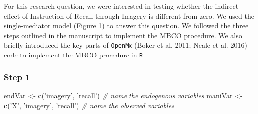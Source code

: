 \documentclass[11pt,]{article}
\newenvironment{Shaded}{\begin{snugshade}}{\end{snugshade}}
\newcommand{\CommentTok}[1]{\textcolor[rgb]{0.56,0.35,0.01}{\textit{#1}}}
\newcommand{\KeywordTok}[1]{\textcolor[rgb]{0.13,0.29,0.53}{\textbf{#1}}}
\newcommand{\NormalTok}[1]{#1}
\newcommand{\StringTok}[1]{\textcolor[rgb]{0.31,0.60,0.02}{#1}}
\begin{document}
For this research question, we were interested in testing whether the
indirect effect of Instruction of Recall through Imagery is different
from zero. We used the single-mediator model (Figure 1) to answer this
question. We followed the three steps outlined in the manuscript to
implement the MBCO procedure. We also briefly introduced the key parts
of \texttt{OpenMx} (Boker et al. 2011; Neale et al. 2016) code to
implement the MBCO procedure in \texttt{R}.

\hypertarget{step-1}{%
\subsubsection{Step 1}\label{step-1}}

\begin{Shaded}
\begin{Highlighting}[]
\NormalTok{endVar <-}\StringTok{ }\KeywordTok{c}\NormalTok{(}\StringTok{'imagery'}\NormalTok{, }\StringTok{'recall'}\NormalTok{) }\CommentTok{# name the endogenous variables}
\NormalTok{maniVar <-}
\StringTok{  }\KeywordTok{c}\NormalTok{(}\StringTok{'X'}\NormalTok{, }\StringTok{'imagery'}\NormalTok{, }\StringTok{'recall'}\NormalTok{) }\CommentTok{# name the observed variables}


\end{Highlighting}
\end{Shaded}
\end{document}
